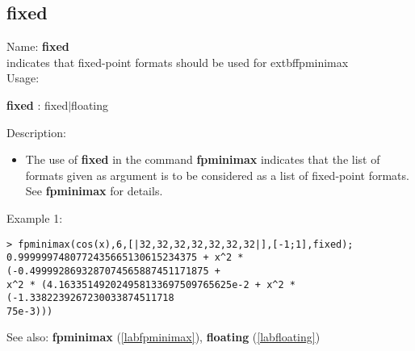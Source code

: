 \subsection{fixed}
\label{labfixed}
\noindent Name: \textbf{fixed}\\
indicates that fixed-point formats should be used for 	extbf{fpminimax}\\
\noindent Usage: 
\begin{center}
\textbf{fixed} : \textsf{fixed$|$floating}
\end{center}
\noindent Description: \begin{itemize}

\item The use of \textbf{fixed} in the command \textbf{fpminimax} indicates that the list of
   formats given as argument is to be considered as a list of fixed-point
   formats.
   See \textbf{fpminimax} for details.
\end{itemize}
\noindent Example 1: 
\begin{center}\begin{minipage}{15cm}\begin{Verbatim}[frame=single]
> fpminimax(cos(x),6,[|32,32,32,32,32,32,32|],[-1;1],fixed);
0.9999997480772435665130615234375 + x^2 * (-0.4999928693287074565887451171875 + 
x^2 * (4.163351492024958133697509765625e-2 + x^2 * (-1.3382239267230033874511718
75e-3)))
\end{Verbatim}
\end{minipage}\end{center}
See also: \textbf{fpminimax} (\ref{labfpminimax}), \textbf{floating} (\ref{labfloating})
